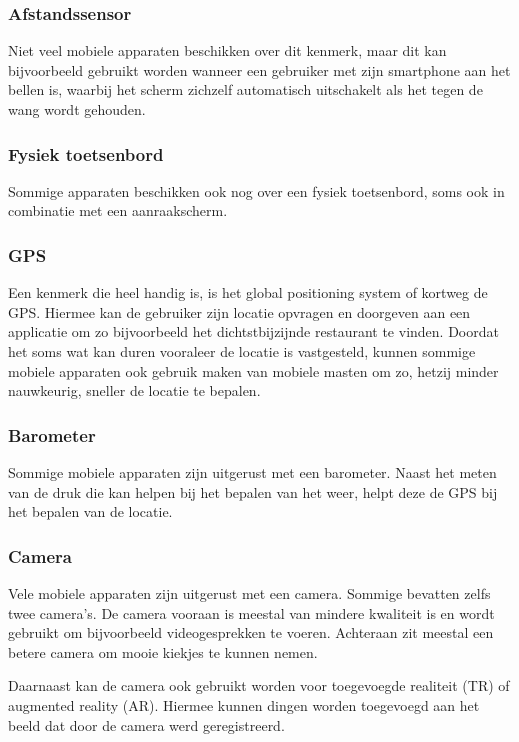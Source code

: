 \subsubsection{Afstandssensor}
Niet veel mobiele apparaten beschikken over dit kenmerk, maar dit kan bijvoorbeeld gebruikt worden wanneer een gebruiker met zijn smartphone aan het bellen is, waarbij het scherm zichzelf automatisch uitschakelt als het tegen de wang wordt gehouden.

\subsubsection{Fysiek toetsenbord}
Sommige apparaten beschikken ook nog over een fysiek toetsenbord, soms ook in combinatie met een aanraakscherm. 

\subsubsection{GPS}
Een kenmerk die heel handig is, is het global positioning system of kortweg de GPS. Hiermee kan de gebruiker zijn locatie opvragen en doorgeven aan een applicatie om zo bijvoorbeeld het dichtstbijzijnde restaurant te vinden. Doordat het soms wat kan duren vooraleer de locatie is vastgesteld, kunnen sommige mobiele apparaten ook gebruik maken van mobiele masten om zo, hetzij minder nauwkeurig, sneller de locatie te bepalen.

\subsubsection{Barometer}
Sommige mobiele apparaten zijn uitgerust met een barometer. Naast het meten van de druk die kan helpen bij het bepalen van het weer, helpt deze de GPS bij het bepalen van de locatie.

\subsubsection{Camera}
Vele mobiele apparaten zijn uitgerust met een camera. Sommige bevatten zelfs twee camera's. De camera vooraan is meestal van mindere kwaliteit is en wordt gebruikt om bijvoorbeeld videogesprekken te voeren. Achteraan zit meestal een betere camera om mooie kiekjes te kunnen nemen.

Daarnaast kan de camera ook gebruikt worden voor toegevoegde realiteit (TR) of  augmented reality (AR). Hiermee kunnen dingen worden toegevoegd aan het beeld dat door de camera werd geregistreerd.


